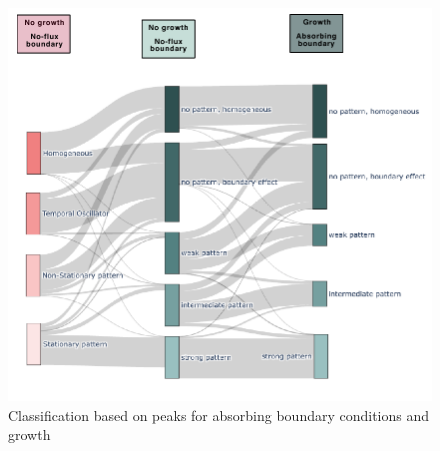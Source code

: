 \begin{figure}[H] %
    \centering
    \begin{adjustbox}{center}
        \includegraphics[width=1\textwidth]{chapters/Chapter 1/3layer_sankey} %
    \end{adjustbox}
    \caption{Classification based on peaks for absorbing boundary conditions and growth}
    \label{fig:3layer_sankey} %
\end{figure}







